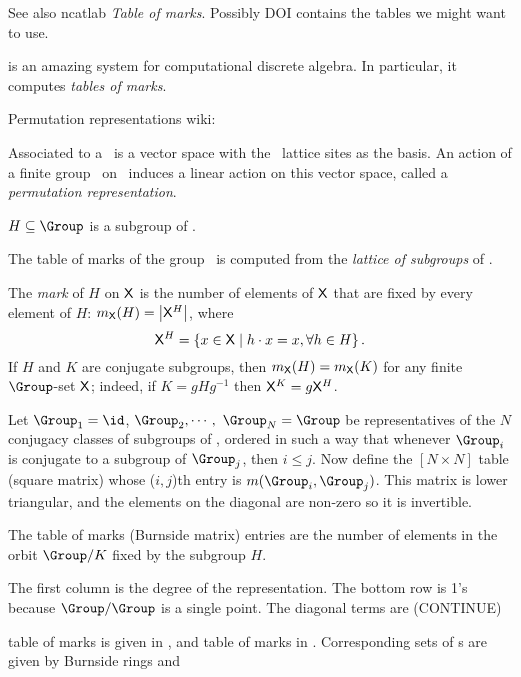 See also
 {ncatlab {\em Table of marks}}.
Possibly 
{DOI} contains the tables we might want to use.

 is an amazing system for computational discrete algebra.
In particular, it computes
     {{\em tables of marks}}.

{Permutation representations wiki}:

Associated to a {\lattstate} \Xx\ is a vector space with the \Xx\ lattice sites
as the basis.  An action of a finite group \Group\ on \Xx\ induces a linear
action on this vector space, called a \emph{permutation representation}.

$H\subseteq\Group$ is a subgroup of \Group.

The table of marks of the group  \Group\ is computed from the \emph{lattice
of subgroups} of \Group.

The \emph{mark} of $H$ on $\mathsf{X}$ is the number of elements of $\mathsf{X}$ that are
fixed by every element of $H$:
$m_{\mathsf{X}}(H) = \left|\mathsf{X}^H\right|$,
where
\[\mathsf{X}^H = \{ x\in \mathsf{X} \mid h\cdot x = x, \forall h\in H\}
\,.
\]
If $H$ and $K$ are conjugate subgroups, then $m_{\mathsf{X}}(H) = m_{\mathsf{X}}(K)$ for any
finite $\Group$-set $\mathsf{X}$; indeed, if $K = gHg^{-1}$ then $\mathsf{X}^K = g\mathsf{X}^H$.

Let $\Group_1=\id$,
$\Group_2,\cdots,$
$\Group_N = \Group$
be representatives of the $N$ conjugacy classes of subgroups of \Group,
ordered in such a way that whenever $\Group_i$ is conjugate to a subgroup of
$\Group_j$, then $i\leq{j}$.  Now define the $[N\times{N}]$ table (square
matrix) whose ($i,j$)th entry is $m(\Group_i,\Group_j)$. This matrix is
lower triangular, and the elements on the diagonal are non-zero so it is
invertible.

The table of marks (Burnside matrix) entries are the number of elements in
the orbit $\Group/K$ fixed by the subgroup $H$.

The first column is the degree of the representation.
The bottom row is 1's because $\Group/\Group$ is a single point.
The diagonal terms are (CONTINUE) %

 table of marks is given in , and  table of
marks in . Corresponding sets of {\lattstate}s are given
by {Burnside rings}  and  

